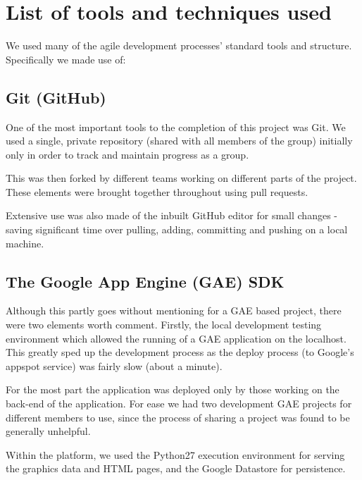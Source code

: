 \chapter{List of tools and techniques used}\label{ch:tools}\vspace{-10mm}
We used many of the agile development processes' standard tools and structure. Specifically we made use of:

\section{Git (GitHub)}
One of the most important tools to the completion of this project was Git. We used a single, private repository (shared with all members of the group) initially only in order to track and maintain progress as a group.

This was then forked by different teams working on different parts of the project. These elements were brought together throughout using pull requests.

Extensive use was also made of the inbuilt GitHub editor for small changes - saving significant time over pulling, adding, committing and pushing on a local machine.

\section{The Google App Engine (GAE) SDK}
Although this partly goes without mentioning for a GAE based project, there were two elements worth comment. Firstly, the local development testing environment which allowed the running of a GAE application on the localhost. This greatly sped up the development process as the deploy process (to Google's appspot service) was fairly slow (about a minute).

For the most part the application was deployed only by those working on the back-end of the application. For ease we had two development GAE projects for different members to use, since the process of sharing a project was found to be generally unhelpful.

Within the platform, we used the Python27 execution environment for serving the graphics data and HTML pages, and the Google Datastore for persistence.

